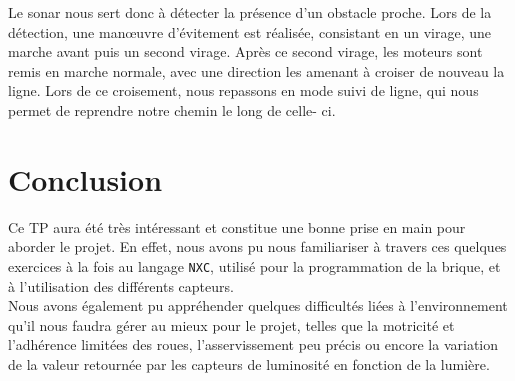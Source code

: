 \documentclass[a4paper]{report}
\begin{document}
Le sonar nous sert donc à détecter la présence d'un obstacle proche. Lors
de la détection, une man\oe{}uvre d'évitement est réalisée, consistant en
un virage, une marche avant puis un second virage. Après ce second virage,
les moteurs sont remis en marche normale, avec une direction les amenant à
croiser de nouveau la ligne. Lors de ce croisement, nous repassons en mode
suivi de ligne, qui nous permet de reprendre notre chemin le long de celle-
ci.\\



\chapter{Conclusion}

Ce TP aura été très intéressant et constitue une bonne prise en main pour
aborder le projet. En effet, nous avons pu nous familiariser à travers ces
quelques exercices à la fois au langage \verb?NXC?, utilisé pour la
programmation de la brique, et à l'utilisation des différents capteurs.\\

Nous avons également pu appréhender quelques difficultés liées à
l'environnement qu'il nous faudra gérer au mieux pour le projet, telles que
la motricité et l'adhérence limitées des roues, l'asservissement peu précis
ou encore la variation de la valeur retournée par les capteurs de luminosité
en fonction de la lumière.
\end{document}
